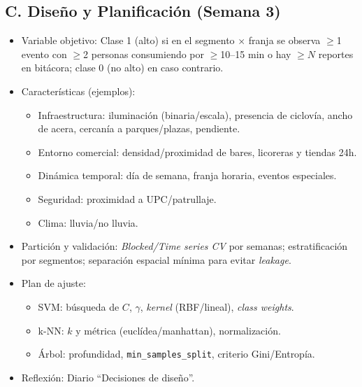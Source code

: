 \documentclass[a4,11pt]{aleph-notas}
\begin{document}
\subsection*{C. Diseño y Planificación (Semana 3)}
\begin{itemize}
    \item {Variable objetivo:} Clase {1 (alto)} si en el {segmento \(\times\) franja} se observa \(\geq\)1 evento con \(\geq\)2 personas consumiendo por \(\geq\)10--15 min {o} hay \(\geq N\) reportes en bitácora; clase {0 (no alto)} en caso contrario.
    \item {Características (ejemplos):}
    \begin{itemize}
        \item Infraestructura: iluminación (binaria/escala), presencia de ciclovía, ancho de acera, cercanía a parques/plazas, pendiente.
        \item Entorno comercial: densidad/proximidad de bares, licoreras y tiendas 24h.
        \item Dinámica temporal: día de semana, franja horaria, eventos especiales.
        \item Seguridad: proximidad a UPC/patrullaje.
        \item Clima: lluvia/no lluvia.
    \end{itemize}
    \item {Partición y validación:} \emph{Blocked/Time series CV} por semanas; estratificación por segmentos; separación espacial mínima para evitar \emph{leakage}.
    \item {Plan de ajuste:}
    \begin{itemize}
        \item {SVM:} búsqueda de \(C\), \(\gamma\), \emph{kernel} (RBF/lineal), \emph{class weights}.
        \item {k-NN:} \(k\) y métrica (euclídea/manhattan), normalización.
        \item {Árbol:} profundidad, \texttt{min\_samples\_split}, criterio Gini/Entropía.
    \end{itemize}
    \item {Reflexión:} Diario ``Decisiones de diseño''.
\end{itemize}
\end{document}
